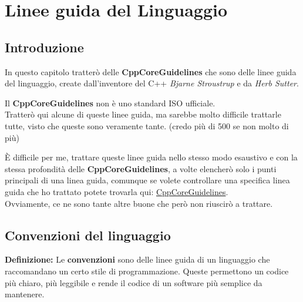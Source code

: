 
\chapter{Linee guida del Linguaggio} %


\section{Introduzione}

\textsf{\small In questo capitolo tratterò delle \textbf{CppCoreGuidelines} che sono delle linee guida del linguaggio, create dall'inventore del C++ \emph{Bjarne Stroustrup} e da \emph{Herb Sutter}.} \break

\textsf{\small Il \textbf{CppCoreGuidelines} non è uno standard ISO ufficiale.} \\

\textsf{\small Tratterò qui alcune di queste linee guida, ma sarebbe molto difficile trattarle tutte, visto che queste sono veramente tante. (credo più di 500 se non molto di più)} \break

\textsf{\small È difficile per me, trattare queste linee guida nello stesso modo esaustivo e con la stessa profondità delle \textbf{CppCoreGuidelines}, a volte elencherò solo i punti principali di una linea guida, comunque se volete controllare una specifica linea guida che ho trattato potete trovarla qui: \href{https://isocpp.github.io/CppCoreGuidelines/CppCoreGuidelines}{CppCoreGuidelines}.} \\
	
\textsf{\small Ovviamente, ce ne sono tante altre buone che però non riuscirò a trattare.} \\



\newpage

\section{Convenzioni del linguaggio}

\textsf{\small \textbf{Definizione: } Le \textbf{convenzioni} sono delle linee guida di un linguaggio che raccomandano un certo stile di programmazione. Queste permettono un codice più chiaro, più leggibile e rende il codice di un software più semplice da mantenere.} \\

